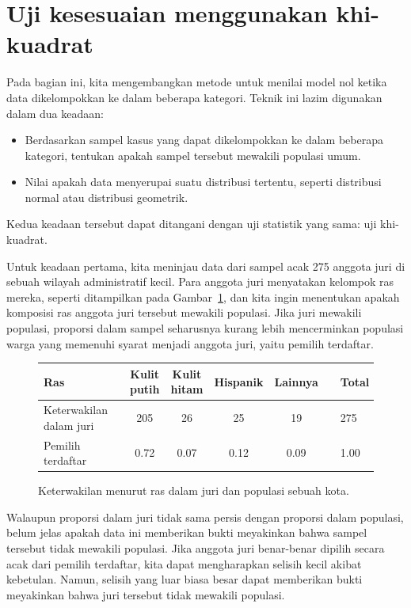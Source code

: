\section{Uji kesesuaian menggunakan khi-kuadrat}
\label{oneWayChiSquare}

Pada bagian ini, kita mengembangkan metode untuk menilai model nol ketika data dikelompokkan ke dalam beberapa kategori.
Teknik ini lazim digunakan dalam dua keadaan:
\begin{itemize}
\setlength{\itemsep}{0mm}
\item Berdasarkan sampel kasus yang dapat dikelompokkan ke dalam beberapa kategori, tentukan apakah sampel tersebut mewakili populasi umum.
\item Nilai apakah data menyerupai suatu distribusi tertentu, seperti distribusi normal atau distribusi geometrik.
\end{itemize}
Kedua keadaan tersebut dapat ditangani dengan uji statistik yang sama: uji khi-kuadrat.


Untuk keadaan pertama, kita meninjau data dari sampel acak 275 anggota juri di sebuah wilayah administratif kecil. Para anggota juri menyatakan kelompok ras mereka, seperti ditampilkan pada Gambar~\ref{juryRepresentationAndCityRepresentationForRace}, dan kita ingin menentukan apakah komposisi ras anggota juri tersebut mewakili populasi. Jika juri mewakili populasi, proporsi dalam sampel seharusnya kurang lebih mencerminkan populasi warga yang memenuhi syarat menjadi anggota juri, yaitu pemilih terdaftar.

\begin{figure}[h]
\centering
\begin{tabular}{ll ccc c ll}
\hline
Ras	 & \hspace{2mm} & Kulit putih & Kulit hitam & Hispanik & Lainnya & \hspace{2mm} & Total \\
\hline
Keterwakilan dalam juri &	& 205 & 26 & 25 & 19 & & 275 \\
Pemilih terdaftar	 & 		& 0.72 & 0.07 & 0.12 & 0.09 & & 1.00 \\
\hline
\end{tabular}
\caption{Keterwakilan menurut ras dalam juri dan populasi sebuah kota.}
\label{juryRepresentationAndCityRepresentationForRace}
\end{figure}

Walaupun proporsi dalam juri tidak sama persis dengan proporsi dalam populasi, belum jelas apakah data ini memberikan bukti meyakinkan bahwa sampel tersebut tidak mewakili populasi. Jika anggota juri benar-benar dipilih secara acak dari pemilih terdaftar, kita dapat mengharapkan selisih kecil akibat kebetulan. Namun, selisih yang luar biasa besar dapat memberikan bukti meyakinkan bahwa juri tersebut tidak mewakili populasi.

